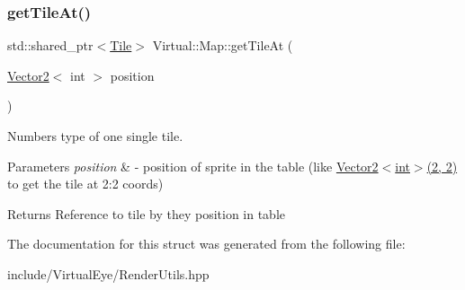 \subsubsection{\texorpdfstring{get\+Tile\+At()}{getTileAt()}}
{\footnotesize\ttfamily std\+::shared\+\_\+ptr$<$\hyperlink{class_virtual_1_1_tile}{Tile}$>$ Virtual\+::\+Map\+::get\+Tile\+At (\begin{DoxyParamCaption}\item[{\hyperlink{struct_virtual_1_1_vector2}{Vector2}$<$ int $>$}]{position }\end{DoxyParamCaption})}



Numbers type of one single tile. 


\begin{DoxyParams}{Parameters}
{\em position} & -\/ position of sprite in the table (like \hyperlink{struct_virtual_1_1_vector2}{Vector2$<$int$>$(2, 2)} to get the tile at 2\+:2 coords)\\
\hline
\end{DoxyParams}
\begin{DoxyReturn}{Returns}
Reference to tile by they position in table 
\end{DoxyReturn}


The documentation for this struct was generated from the following file\+:\begin{DoxyCompactItemize}
\item 
include/\+Virtual\+Eye/Render\+Utils.\+hpp\end{DoxyCompactItemize}
